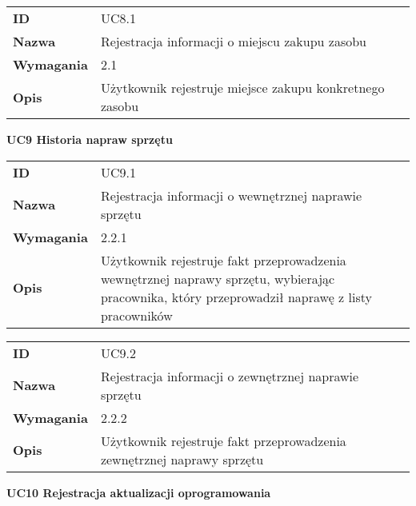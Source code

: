 \begin{tabular}{p{}p{}}
\hfill {\bf ID} & UC8.1 \\
\hfill {\bf Nazwa} & Rejestracja informacji o miejscu zakupu zasobu  \\
\hfill {\bf Wymagania} &  2.1 \\
\hfill {\bf Opis} &  Użytkownik rejestruje miejsce zakupu konkretnego zasobu \\
\end{tabular}

\vspace{.03\textheight}
\begin{center}
  {\Large\bf UC9 Historia napraw sprzętu} \\
\end{center}
\vspace{.02\textheight}

\begin{tabular}{p{}p{}}
\hfill {\bf ID} & UC9.1 \\
\hfill {\bf Nazwa} & Rejestracja informacji o wewnętrznej naprawie sprzętu \\
\hfill {\bf Wymagania} &  2.2.1 \\
\hfill {\bf Opis} & Użytkownik rejestruje fakt przeprowadzenia wewnętrznej naprawy sprzętu, wybierając pracownika, który przeprowadził naprawę z listy pracowników \\
\end{tabular}

\vspace{.05\textheight}

\begin{tabular}{p{}p{}}
\hfill {\bf ID} & UC9.2 \\
\hfill {\bf Nazwa} &  Rejestracja informacji o zewnętrznej naprawie sprzętu \\
\hfill {\bf Wymagania} &  2.2.2 \\
\hfill {\bf Opis} &  Użytkownik rejestruje fakt przeprowadzenia zewnętrznej naprawy sprzętu \\
\end{tabular}

\vspace{.03\textheight}
\begin{center}
  {\Large\bf UC10 Rejestracja aktualizacji oprogramowania} \\
\end{center}
\vspace{.02\textheight}

